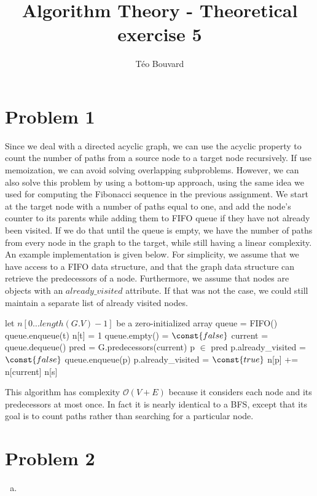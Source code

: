 \documentclass[a4paper, 10pt, twoside]{article}
\begin{document}
\title{Algorithm Theory - Theoretical exercise 5}
\author{T\'eo Bouvard}
\maketitle

\section*{Problem 1}

Since we deal with a directed acyclic graph, we can use the acyclic property to count the number of paths from a source node to a target node recursively. If use memoization, we can avoid solving overlapping subproblems. However, we can also solve this problem by using a bottom-up approach, using the same idea we used for computing the Fibonacci sequence in the previous assignment.
We start at the target node with a number of paths equal to one, and add the node's counter to its parents while adding them to FIFO queue if they have not already been visited. If we do that until the queue is empty, we have the number of paths from every node in the graph to the target, while still having a linear complexity. An example implementation is given below. For simplicity, we assume that we have access to a FIFO data structure, and that the graph data structure can retrieve the predecessors of a node. Furthermore, we assume that nodes are objects with an $already\_visited$ attribute. If that was not the case, we could still maintain a separate list of already visited nodes.

\begin{codebox}
	\zi let $n[0 \ldots length(G.V) - 1]$ be a zero-initialized array 
	\zi queue = FIFO()
	\zi queue.enqueue(t)
	\zi n[t] = 1
	\zi \While queue.empty() = $\const{false}$ \Do
	\zi current = queue.dequeue()
	\zi pred = G.predecessors(current)
	\zi \For p $\in$ pred \Do
	\zi \If p.already\_visited = $\const{false}$ \Do
	\zi queue.enqueue(p)
	\zi p.already\_visited = $\const{true}$ \End
	\zi n[p] += n[current] \End \End
	\zi \Return n[s] \End
\end{codebox}

This algorithm has complexity $\mathcal{O}(V+E)$ because it considers each node and its predecessors at most once. In fact it is nearly identical to a BFS, except that its goal is to count paths rather than searching for a particular node.

\section*{Problem 2}
\begin{enumerate}[a)]
	\item 
	
\end{enumerate}
\end{document}
